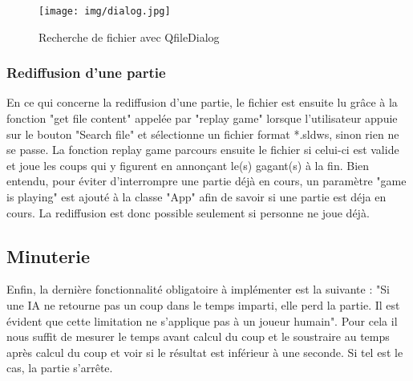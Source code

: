 \documentclass[utf8]{article}
\begin{document}
\begin{figure}[H]
  \centering
	\texttt{[image: img/dialog.jpg]}
	\caption{Recherche de fichier avec QfileDialog}
  \label{fig:logo}
\end{figure}


\subsubsection{Rediffusion d'une partie}
\qquad En ce qui concerne la rediffusion d'une partie, le fichier est ensuite lu grâce à la fonction "get file content" appelée par "replay game"  lorsque l'utilisateur appuie sur le bouton "Search file" et sélectionne un fichier format *.sldws, sinon rien ne se passe. La fonction replay game parcours ensuite le fichier si celui-ci est valide et joue les coups qui y figurent en annonçant 
le(s) gagant(s) à la fin. Bien entendu, pour éviter d'interrompre une partie déjà en cours, un paramètre "game is playing" est ajouté à la classe "App" afin de savoir si une partie est déja en cours.
La rediffusion est donc possible seulement si personne ne joue déjà.

\begin{figure}[H]
\begin{minipage}{\textwidth}
  \centering
	
  \label{fig:code_exemple}
\end{minipage}
\end{figure}


\subsection{Minuterie}

\qquad Enfin, la dernière fonctionnalité obligatoire à implémenter est la suivante :
"Si une IA ne retourne pas un coup dans le temps imparti, elle perd la partie. Il est évident que cette limitation ne s’applique pas à un joueur humain".\newline
\qquad Pour cela il nous suffit de mesurer le temps avant calcul du coup et le soustraire au temps après calcul du coup et voir si le résultat est inférieur à une seconde. 
Si tel est le cas, la partie s'arrête.

\begin{figure}[H]
\begin{minipage}{\textwidth}
  \centering
	
  \label{fig:code_exemple}
\end{minipage}
\end{figure}
\end{document}
